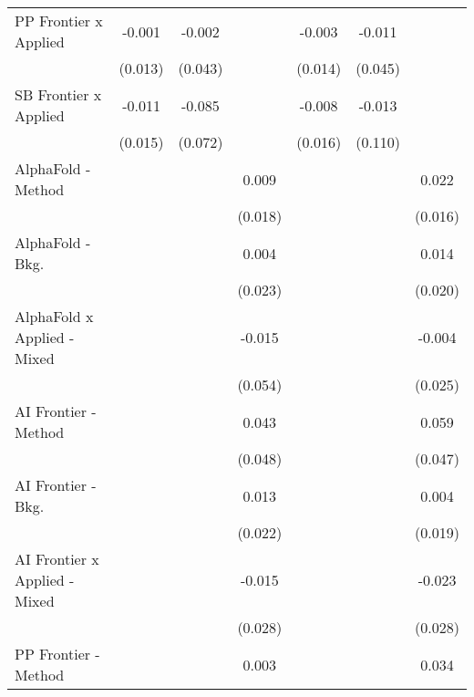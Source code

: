 \begin{tabular}{lcccccc}
   PP Frontier x Applied          & -0.001       & -0.002        &              & -0.003       & -0.011  &   \\   
                                  & (0.013)      & (0.043)       &              & (0.014)      & (0.045) &   \\   
   SB Frontier x Applied          & -0.011       & -0.085        &              & -0.008       & -0.013  &   \\   
                                  & (0.015)      & (0.072)       &              & (0.016)      & (0.110) &   \\   
   AlphaFold - Method             &              &               & 0.009        &              &         & 0.022\\   
                                  &              &               & (0.018)      &              &         & (0.016)\\   
   AlphaFold - Bkg.               &              &               & 0.004        &              &         & 0.014\\   
                                  &              &               & (0.023)      &              &         & (0.020)\\   
   AlphaFold x Applied - Mixed    &              &               & -0.015       &              &         & -0.004\\   
                                  &              &               & (0.054)      &              &         & (0.025)\\   
   AI Frontier - Method           &              &               & 0.043        &              &         & 0.059\\   
                                  &              &               & (0.048)      &              &         & (0.047)\\   
   AI Frontier - Bkg.             &              &               & 0.013        &              &         & 0.004\\   
                                  &              &               & (0.022)      &              &         & (0.019)\\   
   AI Frontier x Applied - Mixed  &              &               & -0.015       &              &         & -0.023\\   
                                  &              &               & (0.028)      &              &         & (0.028)\\   
   PP Frontier - Method           &              &               & 0.003        &              &         & 0.034\\   

\end{tabular}
